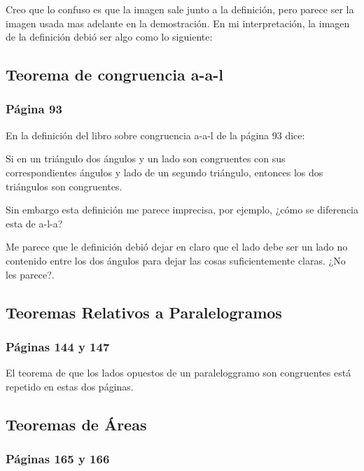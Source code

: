 Creo que lo confuso es que la imagen sale junto a la definición, pero parece ser la imagen usada mas adelante en la demostración. En mi interpretación, la imagen de la definición debió ser algo como lo siguiente:

\begin{figure}[!h]
    \centering
    
    \label{fig:intext-angles}
\end{figure}

\subsection{Teorema de congruencia a-a-l}
\subsubsection{Página 93}

En la definición del libro sobre congruencia a-a-l de la página 93 dice:

Si en un triángulo dos ángulos y un lado son congruentes con sus correspondientes ángulos y lado de un segundo triángulo, entonces los dos triángulos son congruentes.

Sin embargo esta definición me parece imprecisa, por ejemplo, ¿cómo se diferencia esta de a-l-a?

Me parece que le definición debió dejar en claro que el lado debe ser un lado no contenido entre los dos ángulos para dejar las cosas suficientemente claras. ¿No les parece?.

\subsection{Teoremas Relativos a Paralelogramos}
\subsubsection{Páginas 144 y 147}

El teorema de que los lados opuestos de un paraleloggramo son congruentes está repetido en estas dos páginas.

\subsection{Teoremas de Áreas}
\subsubsection{Páginas 165 y 166}

